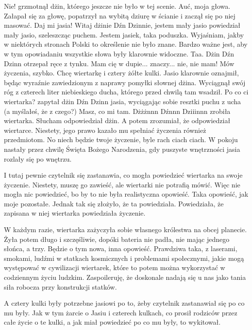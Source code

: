 \begin{dialogue}
	\ds{} Nie! \dm{} grzmotnął dżin, którego jeszcze nie było w tej scenie. \dm{} Auć, moja głowa. \dm{}
	Załapał się za głowę, popatrzył na wybitą dziurę w ścianie i zaczął się po niej masować. \dm{} Daj mi jasia!
	\ds{} Witaj dżinie Dźn Dzinnie, jestem mały jasio \dm{} powiedział mały jasio, szeleszcząc puchem. \dm{} Jestem jasiek, taka poduszka. Wyjaśniam, jakby w niektórych stronach Polski to określenie nie było znane. Bardzo ważne jest, aby w tym opowiadaniu wszystkie słowa były klarownie widoczne.
	\ds{} Taa. \dm{} Dżin Dźn Dzinn otrzepał ręce z tynku. \dm{} Mam cię w dupie... znaczy... nie, nie mam! Mów życzenia, szybko.
	\ds{} Chcę wiertarkę i cztery żółte kulki. \dm{} Jasio klarownie oznajmił, będąc wyraźnie zawiedzionym z naprawy pomyłki słownej dżina. Wyciągnął swój róg z czterech liter niebieskiego ducha, którego przed chwilą tam wsadził.
	\ds{} Po co ci wiertarka? \dm{} zapytał dżin Dźn Dzinn jasia, wyciągając sobie resztki puchu z ucha (a myślałeś, że z czego?) \dm{} Masz, co mi tam.
	\ds{} Dżżżnnn Dźnnn Dziiinnn \dm{} zrobiła wiertarka.
	\ds{} Słucham \dm{} odpowiedział dżin. A potem zrozumiał, że odpowiedział wiertarce. Niestety, jego prawo kazało mu spełniać życzenia również przedmiotom. \dm{} No niech będzie twoje życzenie, byle rach ciach ciach. \dm{} W pokoju nastały przez chwilę Święta Bożego Narodzenia, gdy puszyste wnętrzności jasia rozlały się po wnętrzu.
\end{dialogue}

I tutaj pewnie czytelnik się zastanawia, co mogła powiedzieć wiertarka na swoje życzenie.
Niestety, muszę go zawieść, ale wiertarki nie potrafią mówić. Więc nie mogła nic powiedzieć, bo by to nie była realistyczna opowieść.
Taka opowieść, jak moje pozostałe.
Jednak tak się złożyło, że ta powiedziała. Powiedziała, że zapisana w niej wiertarka powiedziała życzenie.

W każdym razie, wiertarka zażyczyła sobie własnego królestwa na obcej planecie.
Żyła potem długo i szczęśliwie, dopóki bateria nie padła, nie mając jednego słońca, a trzy. 
Będzie o tym nowa, inna opowieść.
Prawdziwa taka, z laserami, smokami, ludźmi w statkach kosmicznych i problemami społecznymi, jakie mogą występować w cywilizacji wiertarek, które to potem można wykorzystać w codziennym życiu ludzkim. 
Zaspoileruję, że doskonale nadają się u nas jako tania siła robocza przy konstrukcji statków.

A cztery kulki były potrzebne jasiowi po to, żeby czytelnik zastanawiał się po co mu były. 
Jak w tym żarcie o Jasiu i czterech kulkach, co prosił rodziców przez całe życie o te kulki, a jak miał powiedzieć po co mu były, to wykitował.

